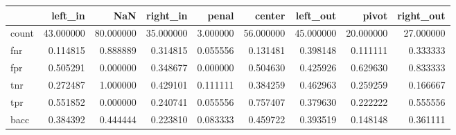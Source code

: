 \begin{tabular}{lrrrrrrrr}
\toprule
{} &    left\_in &        NaN &   right\_in &     penal &     center &   left\_out &      pivot &  right\_out \\
\midrule
count &  43.000000 &  80.000000 &  35.000000 &  3.000000 &  56.000000 &  45.000000 &  20.000000 &  27.000000 \\
fnr   &   0.114815 &   0.888889 &   0.314815 &  0.055556 &   0.131481 &   0.398148 &   0.111111 &   0.333333 \\
fpr   &   0.505291 &   0.000000 &   0.348677 &  0.000000 &   0.504630 &   0.425926 &   0.629630 &   0.833333 \\
tnr   &   0.272487 &   1.000000 &   0.429101 &  0.111111 &   0.384259 &   0.462963 &   0.259259 &   0.166667 \\
tpr   &   0.551852 &   0.000000 &   0.240741 &  0.055556 &   0.757407 &   0.379630 &   0.222222 &   0.555556 \\
bacc  &   0.384392 &   0.444444 &   0.223810 &  0.083333 &   0.459722 &   0.393519 &   0.148148 &   0.361111 \\
\bottomrule
\end{tabular}
